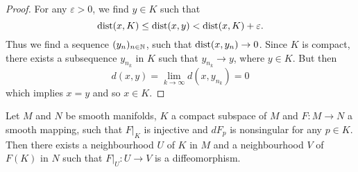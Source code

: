 \begin{proof}
	For any $\varepsilon > 0$, we find $y \in K$ such that 
	\begin{equation*}
		\operatorname{dist}(x,K) \leq \operatorname{dist}(x,y) < \operatorname{dist}(x,K) + \varepsilon.
	\end{equation*}
	Thus we find a sequence $(y_n)_{n \in \mathbb{N}}$, such that $\operatorname{dist}(x,y_n) \to 0$. Since $K$ is compact, there exists a subsequence $y_{n_k}$ in $K$ such that $y_{n_k} \to y$, where $y \in K$. But then 
	\begin{equation*}
		d(x,y) = \lim_{k \to \infty}d(x,y_{n_k}) = 0
	\end{equation*}
	\noindent which implies $x = y$ and so $x \in K$.
\end{proof}

\begin{theorem}
	Let $M$ and $N$ be smooth manifolds, $K$ a compact subspace of $M$ and $F : M \to N$ a smooth mapping, such that $F \vert_K$ is injective and $dF_p$ is nonsingular for any $p \in K$. Then there exists a neighbourhood $U$ of $K$ in $M$ and a neighbourhood $V$ of $F(K)$ in $N$ such that $F\vert_U : U \to V$ is a diffeomorphism.
	\label{thm:generalization_ift_compact}
\end{theorem}

